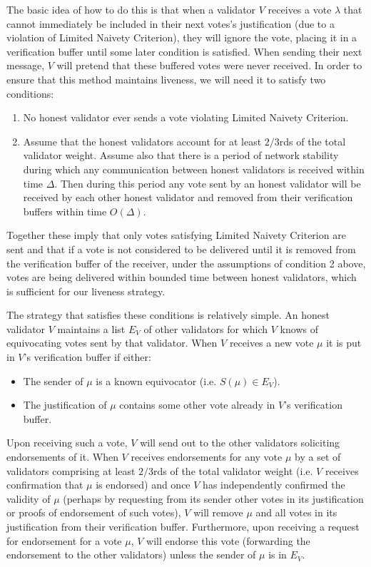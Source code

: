 \documentclass[12pt, fleqn]{article}
\begin{document}
The basic idea of how to do this is that when a validator $V$ receives a vote $\lambda$ that cannot immediately be included in their next votes's justification (due to a violation of Limited Naivety Criterion), they will ignore the vote, placing it in a verification buffer until some later condition is satisfied. When sending their next message, $V$ will pretend that these buffered votes were never received. In order to ensure that this method maintains liveness, we will need it to satisfy two conditions:
\begin{enumerate}
\item No honest validator ever sends a vote violating Limited Naivety Criterion.
\item Assume that the honest validators account for at least $2/3$rds of the total validator weight. Assume also that there is a period of network stability during which any communication between honest validators is received within time $\Delta$. Then during this period any vote sent by an honest validator will be received by each other honest validator and removed from their verification buffers within time $O(\Delta)$.
\end{enumerate}
Together these imply that only votes satisfying Limited Naivety Criterion are sent and that if a vote is not considered to be delivered until it is removed from the verification buffer of the receiver, under the assumptions of condition 2 above, votes are being delivered within bounded time between honest validators, which is sufficient for our liveness strategy.

The strategy that satisfies these conditions is relatively simple. An honest validator $V$ maintains a list $E_V$ of other validators for which $V$ knows of equivocating votes sent by that validator. When $V$ receives a new vote $\mu$ it is put in $V$'s verification buffer if either:
\begin{itemize}
\item The sender of $\mu$ is a known equivocator (i.e. $S(\mu) \in E_V$).
\item The justification of $\mu$ contains some other vote already in $V$'s verification buffer.
\end{itemize}
Upon receiving such a vote, $V$ will send out to the other validators soliciting endorsements of it. When $V$ receives endorsements for any vote $\mu$ by a set of validators comprising at least $2/3$rds of the total validator weight (i.e. $V$ receives confirmation that $\mu$ is endorsed) and once $V$ has independently confirmed the validity of $\mu$ (perhaps by requesting from its sender other votes in its justification or proofs of endorsement of such votes), $V$ will remove $\mu$ and all votes in its justification from their verification buffer. Furthermore, upon receiving a request for endorsement for a vote $\mu$, $V$ will endorse this vote (forwarding the endorsement to the other validators) unless the sender of $\mu$ is in $E_V$.
\end{document}
